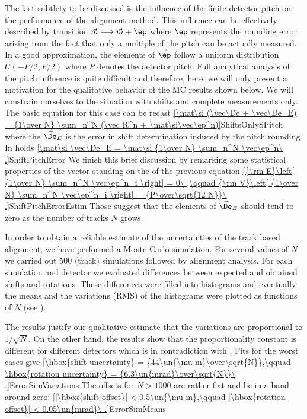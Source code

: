 The last subtlety to be discussed is the influence of the finite detector pitch on the performance of the alignment method. This influence can be effectively described by transition
$\vec m \longrightarrow \vec m + \vec\ep$
where $\vec\ep$ represents the rounding error arising from the fact that only a multiple of the pitch can be actually measured. In a good approximation, the elements of $\vec\ep$ follow a uniform distribution $U(-P/2, P/2)$ where $P$ denotes the detector pitch. Full analytical analysis of the pitch influence is quite difficult and therefore, here, we will only present a motivation for the qualitative behavior of the MC results shown below. We will constrain ourselves to the situation with shifts and complete measurements only. The basic equation for this case  can be recast
\eqref{\mat\si (\vec\De + \vec\De_E) = {1\over N} \sum_n^N (\vec R^n + \mat\si\vec\ep^n)}{ShiftsOnlySPitch}
where the $\vec\De_E$ is the error in shift determination induced by the pitch rounding. In holds
\eqref{\mat\si \vec\De_E = \mat\si {1\over N} \sum_n^N \vec\ep^n\ .}{ShiftPitchError}
We finish this brief discussion by remarking some statistical properties of the vector standing on the \rhs{} of the previous equation
\eqref{{\rm E}\left[ {1\over N} \sum_n^N \vec\ep^n_i \right] = 0\ ,\qquad {\rm V}\left[ {1\over N} \sum_n^N \vec\ep^n_i \right] = {P\over\sqrt{12 N}}\ .}{ShiftPitchErrorEstim}
Those suggest that the elements of $\vec\De_E$ should tend to zero as the number of tracks $N$ grows.

In order to obtain a reliable estimate of the uncertainties of the track based alignment, we have performed a Monte Carlo simulation. For several values of $N$ we carried out 500 (track) simulations followed by alignment analysis. For each simulation and detector we evaluated differences between expected and obtained shifts and rotations. These differences were filled into histograms and eventually the means and the variations (RMS) of the histograms were plotted as functions of $N$ (see ).

The results justify our qualitative estimate  that the variations are proportional to $1/\sqrt{N}$. On the other hand, the results show that the proportionality constant is different for different detectors which is in contradiction with . Fits for the worst cases give
\eqref{\hbox{shift uncertainty} = {44\un{\mu m}\over\sqrt{N}},\qquad \hbox{rotation uncertainty} = {6.3\un{mrad}\over\sqrt{N}}\ .}{ErrorSimVariations}
The offsets for $N > 1000$ are rather flat and lie in a band around zero:
\eqref{|\hbox{shift offset}| < 0.5\un{\mu m},\qquad |\hbox{rotation offset}| < 0.05\un{mrad}\ .}{ErrorSimMeans}

